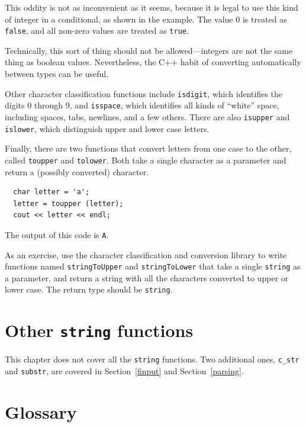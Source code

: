 This oddity is not as inconvenient as it seems, because it is
legal to use this kind of integer in a conditional, as shown
in the example.  The value 0 is treated as {\tt false}, and
all non-zero values are treated as {\tt true}.

Technically, this sort of thing should not be allowed---integers are
not the same thing as boolean values.  Nevertheless, the C++ habit of
converting automatically between types can be useful.

Other character classification functions include {\tt isdigit}, which
identifies the digits 0 through 9, and {\tt isspace}, which identifies
all kinds of ``white'' space, including spaces, tabs, newlines, and a
few others.  There are also {\tt isupper} and {\tt islower}, which
distinguish upper and lower case letters.

Finally, there are two functions that convert letters from one
case to the other, called {\tt toupper} and {\tt tolower}.  Both take
a single character as a parameter and return a (possibly
converted) character.

\begin{verbatim}
  char letter = 'a';
  letter = toupper (letter);
  cout << letter << endl;
\end{verbatim}
%
The output of this code is {\tt A}.

As an exercise, use the character classification and conversion
library to write functions named {\tt stringToUpper} and
{\tt stringToLower} that take a single {\tt string} as
a parameter, and return a string with all the characters converted to
upper or lower case. The return type should be {\tt string}.

\section{Other {\tt string} functions}

This chapter does not cover all the {\tt string} functions.
Two additional ones, {\tt c\_str} and {\tt substr}, are covered
in Section~\ref{finput} and Section~\ref{parsing}.

\section{Glossary}

